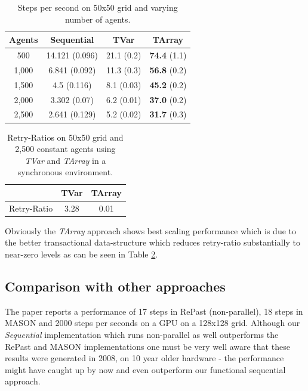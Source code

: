 \begin{table}
	\centering
  	\begin{tabular}{ c || c | c | c }
        Agents  & Sequential     & TVar       & TArray     \\ \hline \hline 
    	500     & 14.121 (0.096) & 21.1 (0.2) & \textbf{74.4} (1.1) \\ \hline
   		1,000   & 6.841 (0.092)  & 11.3 (0.3) & \textbf{56.8} (0.2) \\ \hline
   		1,500   & 4.5 (0.116)    & 8.1 (0.03) & \textbf{45.2} (0.2) \\ \hline
   		2,000   & 3.302 (0.07)   & 6.2 (0.01) & \textbf{37.0} (0.2) \\ \hline 
   		2,500   & 2.641 (0.129)  &5.2 (0.02)  & \textbf{31.7} (0.3)
   	\end{tabular}
  	
  	\caption{Steps per second on 50x50 grid and varying number of agents.}
	\label{tab:state_results_agentsscale_time}
\end{table}

\begin{table}
	\centering
  	\begin{tabular}{ c || c | c }
                    & TVar   & TArray \\ \hline \hline 
		Retry-Ratio & 3.28 & 0.01
   	\end{tabular}
  	
  	\caption{Retry-Ratios on 50x50 grid and 2,500 constant agents using \textit{TVar} and \textit{TArray} in a synchronous environment.}
	\label{tab:tvartarray_results_agentsscale_retries}
\end{table}

Obviously the \textit{TArray} approach shows best scaling performance which is due to the better transactional data-structure which reduces retry-ratio substantially to near-zero levels as can be seen in Table \ref{tab:tvartarray_results_agentsscale_retries}.

\subsection{Comparison with other approaches}
The paper \cite{lysenko_framework_2008} reports a performance of 17 steps in RePast (non-parallel), 18 steps in MASON and 2000 steps per seconds on a GPU on a 128x128 grid. Although our \textit{Sequential} implementation which runs non-parallel as well outperforms the RePast and MASON implementations one must be very well aware that these results were generated in 2008, on 10 year older hardware - the performance might have caught up by now and even outperform our functional sequential approach. 

